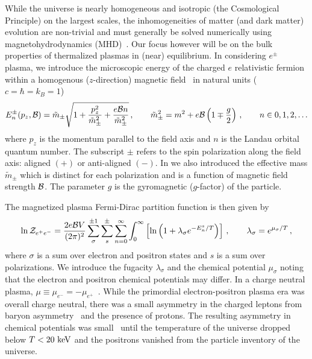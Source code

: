 \documentclass[a4paper]{article}
\begin{document}
While the universe is nearly homogeneous and isotropic (the Cosmological Principle) on the largest scales, the inhomogeneities of matter (and dark matter) evolution are non-trivial and must generally be solved numerically using magnetohydrodynamics (MHD)~\cite{melrose2008quantum,vazza2017simulations}. Our focus however will be on the bulk properties of thermalized plasmas in (near) equilibrium. In considering $e^{\pm}$ plasma, we introduce the microscopic energy of the charged $e$ relativistic fermion within a homogenous ($z$-direction) magnetic field~\cite{steinmetz2018magnetic} in natural units ($c=\hbar=k_{B}=1$)
\begin{align}
    \label{eigenenergy}
    E^{\pm}_{n}(p_{z},{\cal B})={\tilde m}_{\pm}\sqrt{1+\frac{p_{z}^{2}}{{\tilde m}_{\pm}^{2}}+\frac{e{\cal B}n}{{\tilde m}_{\pm}^{2}}}\,,\qquad {\tilde m}_{\pm}^{2}=m^{2}+e{\cal B}\left(1\mp\frac{g}{2}\right)\,,\qquad n\in0,1,2,\ldots
\end{align}
where $p_{z}$ is the momentum parallel to the field axis and $n$ is the Landau orbital quantum number. The subscript $\pm$ refers to the spin polarization along the field axis: aligned $(+)$ or anti-aligned $(-)$. In  we also introduced the effective mass ${\tilde m}_{\pm}$ which is distinct for each polarization and is a function of magnetic field strength ${\cal B}$. The parameter $g$ is the gyromagnetic ($g$-factor) of the particle.

The magnetized plasma Fermi-Dirac partition function is then given by
\begin{align}
    \label{partition}
    \ln{\cal Z}_{e^{+}e^{-}}=\frac{2e{\cal B}V}{(2\pi)^{2}}\sum_{\sigma}^{\pm1}\sum_{s}^{\pm}\sum_{n=0}^{\infty}\int_{0}^{\infty}\left[\ln\left(1+\lambda_{\sigma}e^{-E_{n}^{s}/T}\right)\right]\,,\qquad\lambda_{\sigma}=e^{\mu_{\sigma}/T}\,,
\end{align}
where $\sigma$ is a sum over electron and positron states and $s$ is a sum over polarizations. We introduce the fugacity $\lambda_{\sigma}$ and the chemical potential $\mu_{\sigma}$ noting that the electron and positron chemical potentials may differ. In a charge neutral plasma, $\mu\equiv\mu_{e^{-}}=-\mu_{e^{+}}$~\cite{elze1980relativistic}. While the primordial electron-positron plasma era was overall charge neutral, there was a small asymmetry in the charged leptons from baryon asymmetry~\cite{canetti2012matter} and the presence of protons. The resulting asymmetry in chemical potentials was small~\cite{rafelski2023short} until the temperature of the universe dropped below $T<20\text{ keV}$ and the positrons vanished from the particle inventory of the universe.
\end{document}
